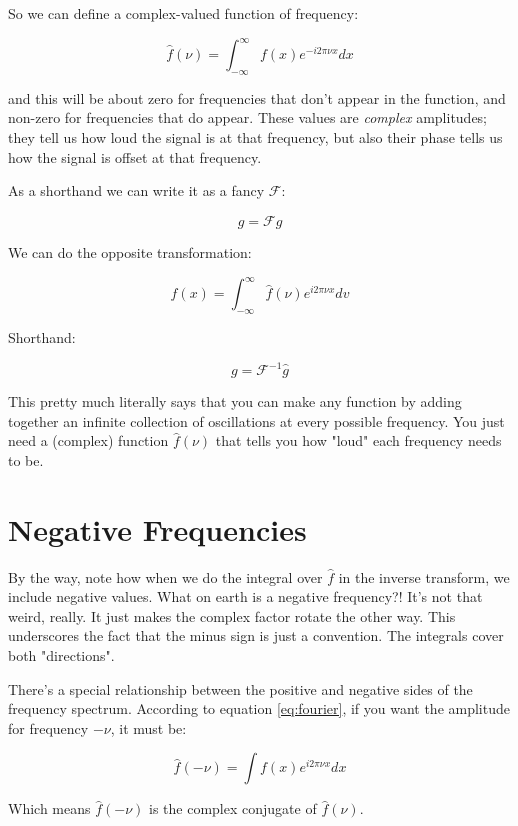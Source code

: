 So we can define a complex-valued function of frequency:

\begin{equation}
    \hat{f}(\nu) = \int_{-\infty}^{\infty} f(x)e^{-i2\pi\nu x} dx
    \label{eq:fourier}
\end{equation}

and this will be about zero for frequencies that don't appear in the function, and non-zero for frequencies that do appear. These values are \textit{complex} amplitudes; they tell us how loud the signal is at that frequency, but also their phase tells us how the signal is offset at that frequency.

As a shorthand we can write it as a fancy $\mathcal{F}$:

$$\hat{g} = \mathcal{F} g$$

We can do the opposite transformation:

\begin{equation}    
f(x) = \int_{-\infty}^{\infty} \hat{f}(\nu)e^{i2\pi\nu x} dv
\label{eq:invfourier}
\end{equation}

Shorthand:

$$g = \mathcal{F}^{-1} \hat{g}$$

This pretty much literally says that you can make any function by adding together an infinite collection of oscillations at every possible frequency. You just need a (complex) function $\hat{f}(\nu)$ that tells you how "loud" each frequency needs to be.

\section{Negative Frequencies}

By the way, note how when we do the integral over $\hat{f}$ in the inverse transform, we include negative values. What on earth is a negative frequency?! It's not that weird, really. It just makes the complex factor rotate the other way. This underscores the fact that the minus sign is just a convention. The integrals cover both "directions".

There's a special relationship between the positive and negative sides of the frequency spectrum. According to equation \eqref{eq:fourier}, if you want the amplitude for frequency $-\nu$, it must be:

$$
\hat{f}(-\nu) = \int f(x)e^{i2\pi\nu x} dx
\label{3}
$$

Which means $\hat{f}(-\nu)$ is the complex conjugate of $\hat{f}(\nu)$.

